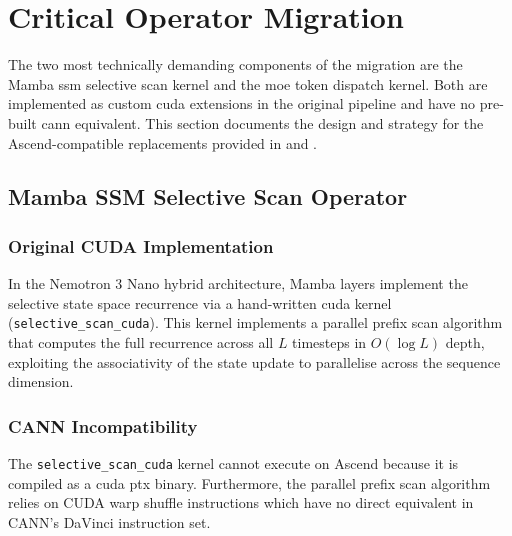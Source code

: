 
\section{Critical Operator Migration}
\label{sec:operator-migration}

The two most technically demanding components of the migration are
the Mamba \acrshort{ssm} selective scan kernel and the \acrshort{moe}
token dispatch kernel. Both are implemented as custom \acrshort{cuda}
extensions in the original pipeline and have no pre-built \acrshort{cann}
equivalent. This section documents the design and strategy for the
Ascend-compatible replacements provided in 
and .

\subsection{Mamba SSM Selective Scan Operator}
\label{sec:mamba-operator}

\subsubsection{Original CUDA Implementation}

In the Nemotron 3 Nano hybrid architecture, Mamba layers implement
the selective state space recurrence via a hand-written \acrshort{cuda}
kernel (\texttt{selective\_scan\_cuda}). This kernel implements a parallel
prefix scan algorithm that computes the full recurrence across all
$L$ timesteps in $O(\log L)$ depth, exploiting the associativity
of the state update to parallelise across the sequence dimension.

\subsubsection{CANN Incompatibility}

The \texttt{selective\_scan\_cuda} kernel cannot execute on Ascend
because it is compiled as a \acrshort{cuda} \acrshort{ptx} binary.
Furthermore, the parallel prefix scan algorithm relies on CUDA warp
shuffle instructions which have no direct equivalent in CANN's DaVinci
instruction set.

